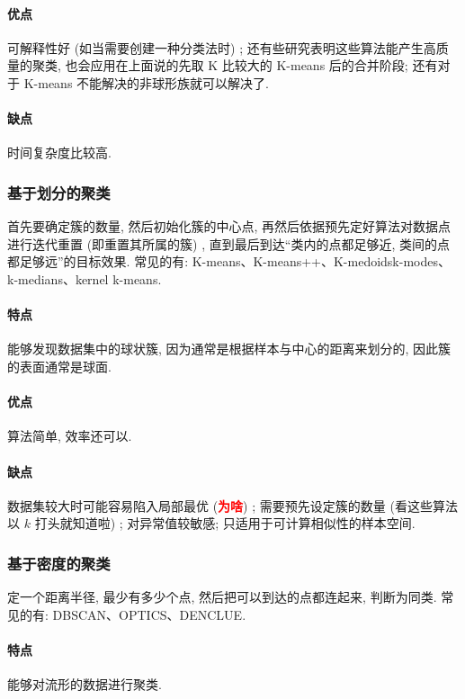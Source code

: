 \paragraph{优点}可解释性好 (如当需要创建一种分类法时) ; 还有些研究表明这些算法能产生高质量的聚类, 也会应用在上面说的先取 K 比较大的 K-means 后的合并阶段; 还有对于 K-means 不能解决的非球形族就可以解决了.  

\paragraph{缺点}时间复杂度比较高. 

\subsubsection{基于划分的聚类}
首先要确定簇的数量, 然后初始化簇的中心点, 再然后依据预先定好算法对数据点进行迭代重置 (即重置其所属的簇) , 直到最后到达“类内的点都足够近, 类间的点都足够远”的目标效果. 常见的有: K-means、K-means++、K-medoidsk-modes、k-medians、kernel k-means. 

\paragraph{特点}能够发现数据集中的球状簇, 因为通常是根据样本与中心的距离来划分的, 因此簇的表面通常是球面. 

\paragraph{优点}算法简单, 效率还可以. 

\paragraph{缺点}数据集较大时可能容易陷入局部最优 (\textcolor{red}{\textbf{为啥}}) ; 需要预先设定簇的数量 (看这些算法以 $k$ 打头就知道啦) ; 对异常值较敏感; 只适用于可计算相似性的样本空间. 
	
\subsubsection{基于密度的聚类}
定一个距离半径, 最少有多少个点, 然后把可以到达的点都连起来, 判断为同类. 常见的有: DBSCAN、OPTICS、DENCLUE. 

\paragraph{特点}能够对流形的数据进行聚类. 
	
